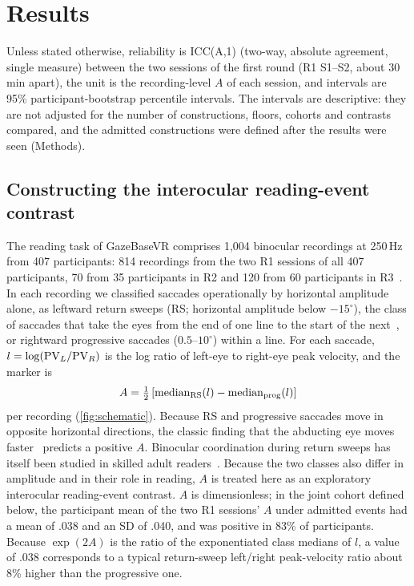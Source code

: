 \section{Results}

Unless stated otherwise, reliability is ICC(A,1) (two-way, absolute agreement, single measure) between the two sessions of the first round (R1 S1--S2, about 30 min apart), the unit is the recording-level $A$ of each session, and intervals are 95\% participant-bootstrap percentile intervals. The intervals are descriptive: they are not adjusted for the number of constructions, floors, cohorts and contrasts compared, and the admitted constructions were defined after the results were seen (Methods).

\subsection{Constructing the interocular reading-event contrast}

The reading task of GazeBaseVR comprises 1,004 binocular recordings at 250\,Hz from 407 participants: 814 recordings from the two R1 sessions of all 407 participants, 70 from 35 participants in R2 and 120 from 60 participants in R3~\citep{lohr2023}. In each recording we classified saccades operationally by horizontal amplitude alone, as leftward return sweeps (RS; horizontal amplitude below $-15^\circ$), the class of saccades that take the eyes from the end of one line to the start of the next~\citep{parker2019vr,slattery2019}, or rightward progressive saccades ($0.5$--$10^\circ$) within a line. For each saccade, $l = \log(\mathrm{PV}_L/\mathrm{PV}_R)$ is the log ratio of left-eye to right-eye peak velocity, and the marker is
\begin{equation}
A = \tfrac12\left[\operatorname{median}_{\mathrm{RS}}(l) - \operatorname{median}_{\mathrm{prog}}(l)\right]
\label{eq:A}
\end{equation}
per recording (\cref{fig:schematic}). Because RS and progressive saccades move in opposite horizontal directions, the classic finding that the abducting eye moves faster~\citep{collewijn1988} predicts a positive $A$. Binocular coordination during return sweeps has itself been studied in skilled adult readers~\citep{parker2019jov}. Because the two classes also differ in amplitude and in their role in reading, $A$ is treated here as an exploratory interocular reading-event contrast. $A$ is dimensionless; in the joint cohort defined below, the participant mean of the two R1 sessions' $A$ under admitted events had a mean of .038 and an SD of .040, and was positive in 83\% of participants. Because $\exp(2A)$ is the ratio of the exponentiated class medians of $l$, a value of .038 corresponds to a typical return-sweep left/right peak-velocity ratio about 8\% higher than the progressive one.

